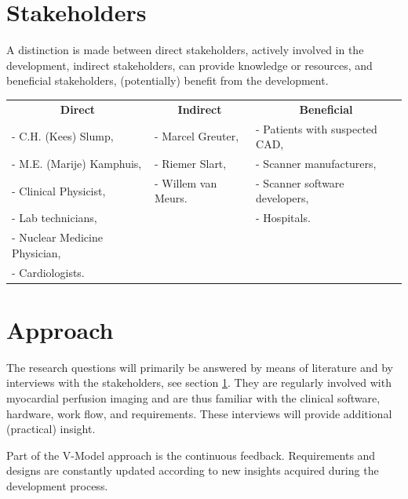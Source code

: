 \section{Stakeholders}
\label{sec:stakeholders}
A distinction is made between direct stakeholders, actively involved in the development, indirect stakeholders, can provide knowledge or resources, and beneficial stakeholders, (potentially) benefit from the development.

\begin{tabular}{lll}
 	\multicolumn{1}{c}{\textbf{Direct}} & \multicolumn{1}{c}{\textbf{Indirect}} & \multicolumn{1}{c}{\textbf{Beneficial}} \\
	 - C.H. (Kees) Slump, &  - Marcel Greuter, & - Patients with suspected \ac{CAD}, \\
	 - M.E. (Marije) Kamphuis, & - Riemer Slart, & - Scanner manufacturers,\\
	 - Clinical Physicist, & - Willem van Meurs. & - Scanner software developers, \\
	 - Lab technicians, & & - Hospitals. \\
	 - Nuclear Medicine Physician, & & \\
	 - Cardiologists. & & \\
\end{tabular}

\section{Approach}
The research questions will primarily be answered by means of literature and by interviews with the stakeholders, see section \ref{sec:stakeholders}. They are regularly involved with myocardial perfusion imaging and are thus familiar with the clinical software, hardware, work flow, and requirements. These interviews will provide additional (practical) insight.

Part of the V-Model approach is the continuous feedback. Requirements and designs are constantly updated according to new insights acquired during the development process. 

